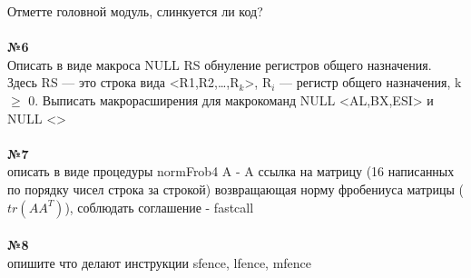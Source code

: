 \documentclass[a4paper,10pt]{article}
\begin{document}
Отметте головной модуль, слинкуется ли код? \\
\vspace{0.3cm} \\
\textbf{№6} \\
Описать в виде макроса NULL RS обнуление регистров общего назначения. Здесь RS — это строка вида <R1,R2,…,R$_k$>, R$_i$ — регистр общего назначения, k $\ge$ 0. Выписать макрорасширения для макрокоманд NULL <AL,BX,ESI> и NULL <> \\
\vspace{0.3cm} \\
\textbf{№7} \\
описать в виде процедуры normFrob4 A - A ссылка на матрицу (16 написанных по порядку чисел строка за строкой) возвращающая норму фробениуса матрицы ($tr(AA^T)$), соблюдать соглашение - fastcall\\
\vspace{0.3cm} \\
\textbf{№8} \\
опишите что делают инструкции sfence, lfence, mfence
\end{document}
